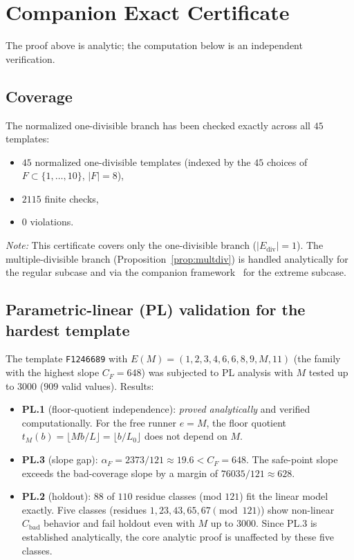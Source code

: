 \documentclass[11pt]{article}
\theoremstyle{definition}
\newcommand{\Ediv}{E_{\mathrm{div}}}
\begin{document}
\section{Companion Exact Certificate}
\label{sec:certificate}

The proof above is analytic; the computation below is an independent
verification.

\subsection*{Coverage}

The normalized one-divisible branch has been checked exactly across all
$45$ templates:
\begin{itemize}
  \item $45$ normalized one-divisible templates (indexed by the $45$
    choices of $F \subset \{1,\ldots,10\}$, $|F| = 8$),
  \item $2115$ finite checks,
  \item $0$ violations.
\end{itemize}

\noindent
\textit{Note:} This certificate covers only the one-divisible branch
($|\Ediv| = 1$).
The multiple-divisible branch (Proposition~\ref{prop:multdiv}) is handled
analytically for the regular subcase and via the companion
framework~\cite{Pal26} for the extreme subcase.

\subsection*{Parametric-linear (PL) validation for the hardest template}

The template \texttt{F1246689} with $E(M) = (1,2,3,4,6,6,8,9,M,11)$
(the family with the highest slope $C_F = 648$) was subjected to PL
analysis with $M$ tested up to $3000$ ($909$ valid values).
Results:
\begin{itemize}
  \item \textbf{PL.1} (floor-quotient independence): \emph{proved analytically}
    and verified computationally.
    For the free runner $e = M$, the floor quotient
    $t_M(b) = \lfloor Mb/L \rfloor = \lfloor b/L_0 \rfloor$
    does not depend on $M$.
  \item \textbf{PL.3} (slope gap): $\alpha_F = 2373/121 \approx 19.6 < C_F = 648$.
    The safe-point slope exceeds the bad-coverage slope by a margin of
    $76035/121 \approx 628$.
  \item \textbf{PL.2} (holdout): $88$ of $110$ residue classes (mod $121$)
    fit the linear model exactly.
    Five classes (residues $1, 23, 43, 65, 67 \pmod{121}$) show non-linear
    $C_{\mathrm{bad}}$ behavior and fail holdout even with $M$ up to $3000$.
    Since PL.3 is established analytically, the core analytic proof is
    unaffected by these five classes.
\end{itemize}
\end{document}
